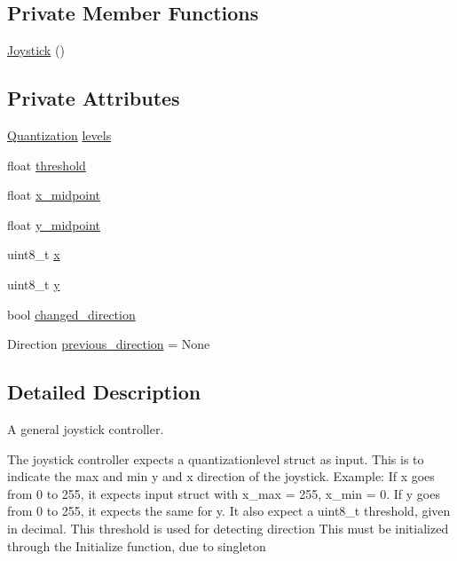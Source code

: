 \subsection*{Private Member Functions}
\begin{DoxyCompactItemize}
\item 
\hyperlink{class_joystick_a158b1f77b78717efbf1b8fac43b1fcef}{Joystick} ()
\end{DoxyCompactItemize}
\subsection*{Private Attributes}
\begin{DoxyCompactItemize}
\item 
\hyperlink{struct_quantization}{Quantization} \hyperlink{class_joystick_ae60f2daf5c456900e821b2fde565ef38}{levels}
\item 
float \hyperlink{class_joystick_a30b68bce5589674148d43b4854b25cef}{threshold}
\item 
float \hyperlink{class_joystick_ace9fd47e90cc88de622f1b8ba7650156}{x\+\_\+midpoint}
\item 
float \hyperlink{class_joystick_a06e00f03f6dd0859663a7a01ada1d3c1}{y\+\_\+midpoint}
\item 
uint8\+\_\+t \hyperlink{class_joystick_abeb4f1563a57266700a48ba5aa49b4cd}{x}
\item 
uint8\+\_\+t \hyperlink{class_joystick_a691b70ed215adf414e0ab4edba5407a2}{y}
\item 
bool \hyperlink{class_joystick_a3e9a785b0764f3b0666e87e77b373b74}{changed\+\_\+direction}
\item 
Direction \hyperlink{class_joystick_abf9509216c86d03fb76abc7ff4507f90}{previous\+\_\+direction} = None
\end{DoxyCompactItemize}


\subsection{Detailed Description}
A general joystick controller. 

The joystick controller expects a quantizationlevel struct as input. This is to indicate the max and min y and x direction of the joystick. Example\+: If x goes from 0 to 255, it expects input struct with x\+\_\+max = 255, x\+\_\+min = 0. If y goes from 0 to 255, it expects the same for y. It also expect a uint8\+\_\+t threshold, given in decimal. This threshold is used for detecting direction This must be initialized through the Initialize function, due to singleton 

